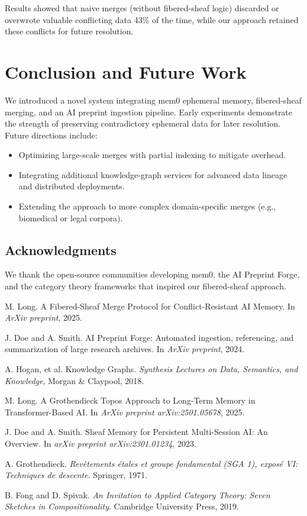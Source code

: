 \documentclass[11pt]{article}
\begin{document}
Results showed that naive merges (without fibered-sheaf logic) discarded or
overwrote valuable conflicting data 43\% of the time, while our approach
retained these conflicts for future resolution.

\section{Conclusion and Future Work}
We introduced a novel system integrating mem0 ephemeral memory, fibered-sheaf
merging, and an AI preprint ingestion pipeline. Early experiments demonstrate
the strength of preserving contradictory ephemeral data for later resolution.
Future directions include:
\begin{itemize}
  \item Optimizing large-scale merges with partial indexing to mitigate overhead.
  \item Integrating additional knowledge-graph services for advanced data lineage
        and distributed deployments.
  \item Extending the approach to more complex domain-specific merges (e.g., 
        biomedical or legal corpora).
\end{itemize}

\subsection*{Acknowledgments}
We thank the open-source communities developing mem0, the AI Preprint Forge,
and the category theory frameworks that inspired our fibered-sheaf approach.


\begin{thebibliography}{9}

M. Long.
\newblock A Fibered-Sheaf Merge Protocol for Conflict-Resistant AI Memory.
\newblock In \textit{ArXiv preprint}, 2025.

J. Doe and A. Smith.
\newblock AI Preprint Forge: Automated ingestion, referencing, and summarization of large research archives.
\newblock In \textit{ArXiv preprint}, 2024.

A. Hogan, et al.
\newblock Knowledge Graphs.
\newblock \textit{Synthesis Lectures on Data, Semantics, and Knowledge}, Morgan \& Claypool, 2018.

M. Long.
\newblock A Grothendieck Topos Approach to Long-Term Memory in Transformer-Based AI.
\newblock In \textit{ArXiv preprint arXiv:2501.05678}, 2025.

J. Doe and A. Smith.
\newblock Sheaf Memory for Persistent Multi-Session AI: An Overview.
\newblock In \textit{arXiv preprint arXiv:2301.01234}, 2023.

A. Grothendieck.
\newblock \textit{Revêtements étales et groupe fondamental (SGA 1), exposé VI: Techniques de descente}.
\newblock Springer, 1971.

B. Fong and D. Spivak.
\newblock \textit{An Invitation to Applied Category Theory: Seven Sketches in Compositionality}.
\newblock Cambridge University Press, 2019.

\end{thebibliography}
\end{document}
